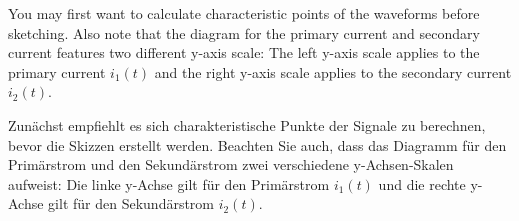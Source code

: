 \begin{hintblock}
	You may first want to calculate characteristic points of the waveforms before sketching. Also note that the diagram for the primary current and secondary current features two different y-axis scale: 	The left y-axis scale applies to the primary current $i_\mathrm{1}(t)$ and the right y-axis scale applies to the secondary current $i_\mathrm{2}(t)$.
\end{hintblock}


\begin{germanhintblock}
	Zunächst empfiehlt es sich charakteristische Punkte der Signale zu berechnen, bevor die Skizzen erstellt werden. Beachten Sie auch, dass das Diagramm für den Primärstrom und den Sekundärstrom zwei verschiedene y-Achsen-Skalen aufweist: Die linke y-Achse gilt für den Primärstrom $i_\mathrm{1}(t)$ und die rechte y-Achse gilt für den Sekundärstrom $i_\mathrm{2}(t)$.
\end{germanhintblock}


